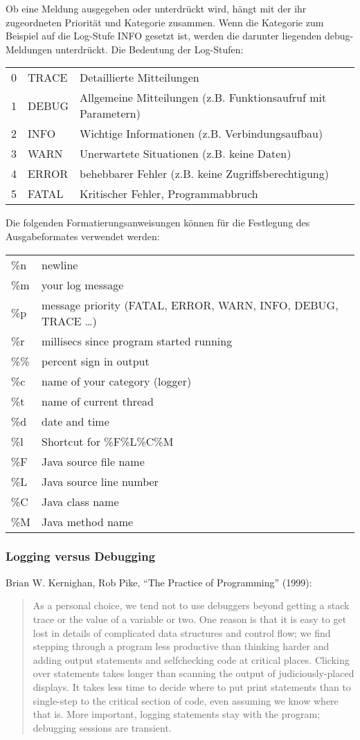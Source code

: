 Ob eine Meldung ausgegeben oder unterdrückt wird, hängt mit der ihr
zugeordneten Priorität und Kategorie zusammen. Wenn die Kategorie zum Beispiel
auf die Log-Stufe INFO gesetzt ist, werden die darunter liegenden
debug-Meldungen unterdrückt.
Die Bedeutung der Log-Stufen:

\begin{tabularx}{\linewidth}{llX}
0 & TRACE & Detaillierte Mitteilungen \\
1 & DEBUG & Allgemeine Mitteilungen (z.B. Funktionsaufruf mit Parametern)\\
2 & INFO & Wichtige Informationen (z.B. Verbindungsaufbau)\\
3 & WARN & Unerwartete Situationen (z.B. keine Daten)\\
4 & ERROR & behebbarer Fehler (z.B. keine Zugriffsberechtigung)\\
5 & FATAL & Kritischer Fehler, Programmabbruch\\
\end{tabularx}

Die folgenden Formatierungsanweisungen können für die Festlegung des
Ausgabeformates verwendet werden:

\begin{tabularx}{\linewidth}{lX}
\%n & newline\\
\%m & your log message\\
\%p & message priority (FATAL, ERROR, WARN, INFO, DEBUG, TRACE \ldots)\\
\%r & millisecs since program started running\\
\%\% & percent sign in output\\
\%c & name of your category (logger)\\
\%t & name of current thread\\
\%d & date and time\\
\%l & Shortcut for \%F\%L\%C\%M\\
\%F & Java source file name\\
\%L & Java source line number\\
\%C & Java class name\\
\%M & Java method name\\
\end{tabularx}
%
\subsubsection{Logging versus Debugging}
Brian W. Kernighan, Rob Pike, ``The Practice of Programming'' (1999):
\begin{quote}
As a personal choice, we tend not to use debuggers beyond getting a stack trace
or the value of a variable or two. One reason is that it is easy to get lost
in details of complicated data structures and control flow; we  find stepping
through a program less productive than thinking harder and adding output
statements and selfchecking code at critical places. Clicking over statements
takes longer than scanning the output of judiciously-placed displays. It takes
less time to decide where to put print statements than to single-step to the
critical section of code, even assuming we know where that is. More important,
logging statements stay with the program; debugging sessions are
transient.
\end{quote}
%
\newslide
